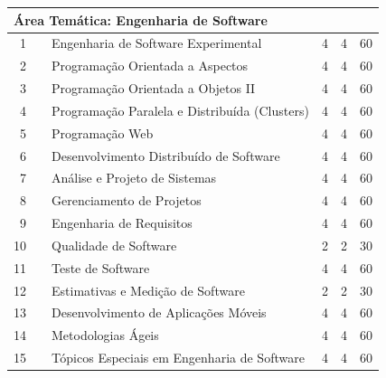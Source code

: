 \documentclass[
	12pt,				%
	openright,			%
  oneside,     %
	a4paper,			%
	english,			%
	french,				%
	spanish,			%
	brazil				%
	]{abntex2}
\begin{document}
\begin{apendicesenv}
\begin{longtable}{r|r|l|r|r|r}
\multicolumn{6}{l}{\textbf{Área Temática: Engenharia de Software}} \\ \hline
    1     &       & Engenharia de Software Experimental & 4     & 4     & 60 \\ \hline
    2     &       & Programação Orientada a Aspectos & 4     & 4     & 60 \\ \hline
    3     &       & Programação Orientada a Objetos II & 4     & 4     & 60 \\ \hline
    4     &       & Programação Paralela e Distribuída (Clusters) & 4     & 4     & 60 \\ \hline
    5     &       & Programação Web & 4   & 4  & 60 \\ \hline
    6     &       & Desenvolvimento Distribuído de Software & 4     & 4     & 60 \\ \hline
    7     &       & Análise e Projeto de Sistemas & 4     & 4     & 60 \\ \hline
    8     &       & Gerenciamento de Projetos & 4     & 4     & 60 \\ \hline
    9     &       & Engenharia de Requisitos & 4     & 4     & 60 \\ \hline
    10    &       & Qualidade de Software & 2     & 2     & 30 \\ \hline
    11    &       & Teste de Software & 4     & 4     & 60 \\ \hline
    12    &       & Estimativas e Medição de Software & 2     & 2     & 30 \\ \hline
    13    &       & Desenvolvimento de Aplicações Móveis & 4     & 4     & 60 \\ \hline
    14    &       & Metodologias Ágeis & 4     & 4     & 60 \\ \hline
    15    &       & \small{Tópicos Especiais em Engenharia de Software} & 4     & 4     & 60 \\ \hline


\end{longtable}
\end{apendicesenv}
\end{document}
